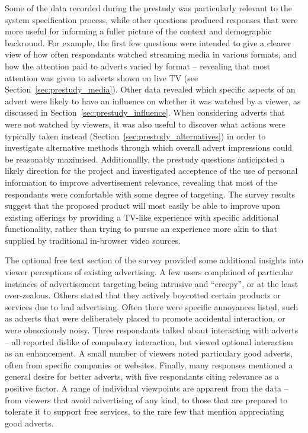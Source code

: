 Some of the data recorded during the prestudy was particularly relevant to the system specification process, while other questions produced responses that were more useful for informing a fuller picture of the context and demographic backround.
For example, the first few questions were intended to give a clearer view of how often respondants watched streaming media in various formats, and how the attention paid to adverts varied by format -- revealing that most attention was given to adverts shown on live TV (see Section~\ref{sec:prestudy_media}).
Other data revealed which specific aspects of an advert were likely to have an influence on whether it was watched by a viewer, as discussed in Section~\ref{sec:prestudy_influence}.
When considering adverts that were not watched by viewers, it was also useful to discover what actions were typically taken instead (Section~\ref{sec:prestudy_alternatives}) in order to investigate alternative methods through which overall advert impressions could be reasonably maximised.
Additionallly, the prestudy questions anticipated a likely direction for the project and investigated acceptence of the use of personal information to improve advertisement relevance, revealing that most of the respondants were comfortable with some degree of targeting.
The survey results suggest that the proposed product will most easily be able to improve upon existing offerings by providing a TV-like experience with specific additional functionality, rather than trying to pursue an experience more akin to that supplied by traditional in-browser video sources.

The optional free text section of the survey provided some additional insights into viewer perceptions of existing advertising.
A few users complained of particular instances of advertisement targeting being intrusive and ``creepy'', or at the least over-zealous. 
Others stated that they actively boycotted certain products or services due to bad advertising.
Often there were specific annoyances listed, such as adverts that were deliberately placed to promote accidental interaction, or were obnoxiously noisy.
Three respondants talked about interacting with adverts -- all reported dislike of compulsory interaction, but viewed optional interaction as an enhancement.
A small number of viewers noted particulary good adverts, often from specific companies or websites. 
Finally, many responses mentioned a general desire for better adverts, with five respondants citing relevance as a positive factor.
A range of individual viewpoints are apparent from the data -- from viewers that avoid advertising of any kind, to those that are prepared to tolerate it to support free services, to the rare few that mention appreciating good adverts.


